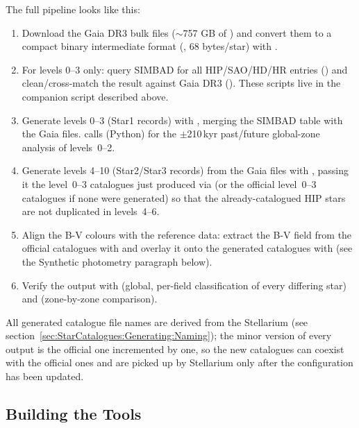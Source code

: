 The full pipeline looks like this:

\begin{enumerate}
  \item Download the Gaia DR3 bulk files ($\sim$757 GB of )
        and convert them to a compact binary intermediate format (,
        68 bytes/star) with .
  \item For levels 0--3 only: query SIMBAD for all HIP/SAO/HD/HR entries
        () and clean/cross-match the
        result against Gaia DR3 ().
        These scripts live in the companion script described above.
  \item Generate levels 0--3 (Star1 records) with ,
        merging the SIMBAD table with the Gaia  files.
         calls  (Python) for the
        $\pm$210\,kyr past/future global-zone analysis of levels~0--2.
  \item Generate levels 4--10 (Star2/Star3 records) from the Gaia
         files with , passing it the
        level~0--3 catalogues just produced via 
        (or the official level~0--3 catalogues if none were generated) so that the already-catalogued HIP stars are not duplicated in
        levels~4--6.
  \item [Optional] Align the B-V colours with the reference data: extract
        the B-V field from the official catalogues with 
        and overlay it onto the generated catalogues with 
        (see the Synthetic photometry paragraph below).
  \item Verify the output with  (global,
        per-field classification of every differing star) and
         (zone-by-zone comparison).
\end{enumerate}

All generated catalogue file names are derived from the Stellarium
 (see
section~\ref{sec:StarCatalogues:Generating:Naming}); the minor version of
every output is the official one incremented by one, so the new catalogues
can coexist with the official ones and are picked up by Stellarium only
after the configuration has been updated.

\subsection{Building the Tools}
\label{sec:StarCatalogues:Generating:Build}


